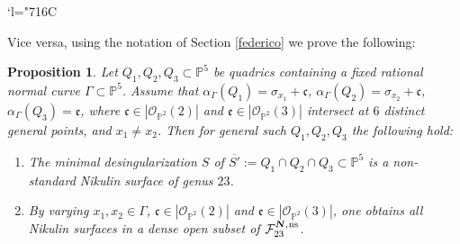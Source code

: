 \documentclass[11pt]{article}
\newcommand{\Changelback}{\mathcode`l="716C}
\newcommand{\ns}{{\mkern1mu\mathrm{ns}}}
\newcommand{\bN}{\boldsymbol{N}}
\theoremstyle{plain}
\newtheorem{prop}[thm]{Proposition}
\theoremstyle{definition}
\newcommand\PP{{\mathbb P}}
\newcommand\F{{\mathcal F}}
\begin{document}
\Changelback

Vice versa, using the notation of Section \ref{federico} we prove the following:

\begin{prop}\label{ita}
Let $Q_1,Q_2,Q_3\subset \PP^5$ be quadrics containing a fixed rational normal curve $\Gamma\subset\PP^5$. Assume that $\alpha_\Gamma(Q_1)=\sigma_{x_1}+\mathfrak{c}$, $\alpha_\Gamma(Q_2)=\sigma_{x_2}+\mathfrak{c}$, $\alpha_\Gamma(Q_3)=\mathfrak{e}$, where $\mathfrak{c}\in |\mathcal O_{\PP^2}(2)|$ and $\mathfrak{e}\in |\mathcal O_{\PP^2}(3)|$ intersect at $6$ distinct general points, and $x_1\neq x_2$. Then for general such $Q_1,Q_2,Q_3$ the following hold:
\begin{enumerate}
\item\label{itai} The minimal desingularization $S$ of $\overline{S'}:= Q_1\cap Q_2\cap Q_3\subset \PP^5$ is a non-standard Nikulin surface of genus $23$.
\item\label{itaii} By varying $x_1,x_2\in \Gamma$, $\mathfrak{c}\in |\mathcal O_{\PP^2}(2)|$ and $\mathfrak{e}\in |\mathcal O_{\PP^2}(3)|$, one obtains all Nikulin surfaces in a dense open subset of $\F_{23}^{\bN,\ns}$.
\end{enumerate}
\end{prop}
\end{document}
